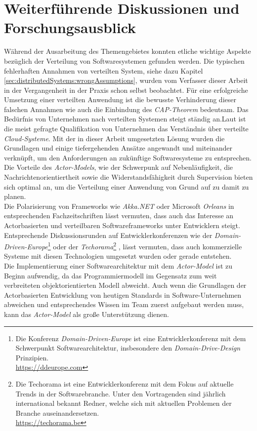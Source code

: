 \section{Weiterführende Diskussionen und Forschungsausblick}
Während der Ausarbeitung des Themengebietes konnten etliche wichtige Aspekte bezüglich der Verteilung von Softwaresystemen gefunden werden. Die typischen fehlerhaften Annahmen von verteilten System, siehe dazu Kapitel \ref{sec:distributedSystems:wrongAssumptions}, wurden vom Verfasser dieser Arbeit in der Vergangenheit in der Praxis schon selbst beobachtet. Für eine erfolgreiche Umsetzung einer verteilten Anwendung ist die bewusste 
Verhinderung dieser falschen Annahmen wie auch die Einbindung des \textit{CAP-Theorem} bedeutsam. 
Das Bedürfnis von Unternehmen nach verteilten Systemen steigt ständig an.Laut \cite{theSkillsCompaniesNeedMost} ist die meist gefragte Qualifikation von Unternehmen das Verständnis über verteilte \textit{Cloud-Systeme}. Mit der in dieser Arbeit umgesetzten Lösung wurden die Grundlagen und einige tiefergehenden Ansätze angewandt und miteinander verknüpft, um den Anforderungen an zukünftige Softwaresysteme zu entsprechen. Die Vorteile des \textit{Actor-Models}, wie der Schwerpunk auf Nebenläufigkeit, die Nachrichtenorientiertheit sowie die Widerstandsfähigkeit durch Supervision bieten sich optimal an, um die Verteilung einer Anwendung von Grund auf zu damit zu planen. \\
Die Polarisierung von Frameworks wie \textit{Akka.NET} oder Microsoft \textit{Orleans} in entsprechenden Fachzeitschriften lässt vermuten, dass auch das Interesse an Actorbasierten und verteilbaren Softwareframeworks unter Entwicklern steigt. Entsprechende Diskussionsrunden auf Entwicklerkonferenzen wie der \textit{Domain-Driven-Europe}\footnote{Die Konferenz \textit{Domain-Driven-Europe} ist eine Entwicklerkonferenz mit dem Schwerpunkt Softwarearchitektur, insbesondere den \textit{Domain-Drive-Design} Prinzipien. \\ \url{https://ddeurope.com} }
oder der \textit{Techorama}\footnote{Die Techorama ist eine Entwicklerkonferenz mit dem Fokus auf aktuelle Trends in der Softwarebranche. Unter den Vortragenden sind jährlich international bekannt Redner, welche sich mit aktuellen Problemen der Branche auseinandersetzen. \\ \url{https://techorama.be} }
, lässt vermuten, dass auch kommerzielle Systeme mit diesen Technologien umgesetzt wurden oder gerade entstehen. \\
Die Implementierung einer Softwarearchitektur mit dem \textit{Actor-Model} ist zu Beginn aufwendig, da das Programmiermodell im Gegensatz zum weit verbreiteten objektorientierten Modell abweicht. 
Auch wenn die Grundlagen der Actorbasierten Entwicklung von heutigen Standards in Software-Unternehmen abweichen und entsprechendes Wissen im Team zuerst aufgebaut werden muss, kann das \textit{Actor-Model} als große Unterstützung dienen.  
